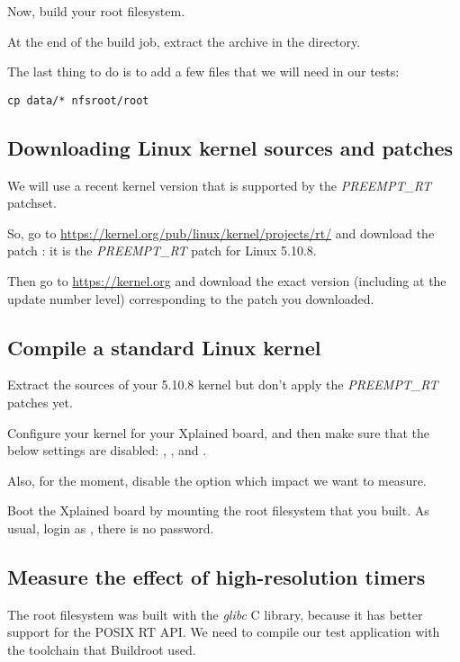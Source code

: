 Now, build your root filesystem.

At the end of the build job, extract the
 archive in the 
directory.

The last thing to do is to add a few files that we will need in our
tests:

\begin{verbatim}
cp data/* nfsroot/root
\end{verbatim}

\subsection{Downloading Linux kernel sources and patches}

We will use a recent kernel version that is supported by the {\em
  PREEMPT\_RT} patchset.

So, go to \url{https://kernel.org/pub/linux/kernel/projects/rt/} and
download the patch : it is the {\em
  PREEMPT\_RT} patch for Linux 5.10.8.

Then go to \url{https://kernel.org} and download the exact version
(including at the update number level) corresponding to the patch you
downloaded.

\subsection{Compile a standard Linux kernel}

Extract the sources of your 5.10.8 kernel but don't apply the {\em
  PREEMPT\_RT} patches yet.

Configure your kernel for your Xplained board, and then make sure
that the below settings are disabled:
, ,
 and .

Also, for the moment, disable the 
option which impact we want to measure.

Boot the Xplained board by mounting the root filesystem that you
built. As usual, login as , there is no password.

\subsection{Measure the effect of high-resolution timers}

The root filesystem was built with the {\em glibc} C library, because
it has better support for the POSIX RT API. We need to compile our
test application with the toolchain that Buildroot used.

